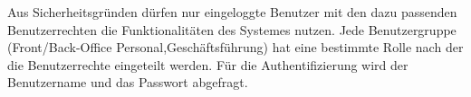 \documentclass[../../Pflichtenheft.tex]{subfiles}
\begin{document}
    Aus Sicherheitsgründen dürfen nur eingeloggte Benutzer mit den dazu passenden Benutzerrechten die Funktionalitäten
    des Systemes nutzen. Jede Benutzergruppe (Front/Back-Office Personal,Geschäftsführung) hat eine bestimmte Rolle nach der die Benutzerrechte eingeteilt werden.
    Für die Authentifizierung wird der Benutzername und das Passwort abgefragt.
\end{document}
